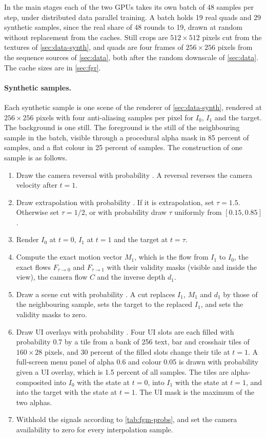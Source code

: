 In the main stages each of the two GPUs takes its own batch of 48 samples per step, under distributed data parallel training. A batch holds 19 real quads and 29 synthetic samples, since the real share  of 48 rounds to 19, drawn at random without replacement from the caches. Still crops are $512\times512$ pixels cut from the textures of \cref{sec:data-synth}, and quads are four frames of $256\times256$ pixels from the sequence sources of \cref{sec:data}, both after the random downscale of \cref{sec:data}. The cache sizes are in \cref{sec:fgr}.

\paragraph{Synthetic samples.} Each synthetic sample is one scene of the renderer of \cref{sec:data-synth}, rendered at $256\times256$ pixels with four anti-aliasing samples per pixel for $I_0$, $I_1$ and the target. The background is one still. The foreground is the still of the neighbouring sample in the batch, visible through a procedural alpha mask in 85 percent of samples, and a flat colour in 25 percent of samples. The construction of one sample is as follows.
\begin{enumerate}
\item Draw the camera reversal with probability . A reversal reverses the camera velocity after $t=1$.
\item Draw extrapolation with probability . If it is extrapolation, set $\tau=1.5$. Otherwise set $\tau=1/2$, or with probability  draw $\tau$ uniformly from $[0.15,0.85]$.
\item Render $I_0$ at $t=0$, $I_1$ at $t=1$ and the target at $t=\tau$.
\item Compute the exact motion vector $M_1$, which is the flow from $I_1$ to $I_0$, the exact flows $F_{\tau\to0}$ and $F_{\tau\to1}$ with their validity masks (visible and inside the view), the camera flow $C$ and the inverse depth $d_1$.
\item Draw a scene cut with probability . A cut replaces $I_1$, $M_1$ and $d_1$ by those of the neighbouring sample, sets the target to the replaced $I_1$, and sets the validity masks to zero.
\item Draw UI overlays with probability . Four UI slots are each filled with probability 0.7 by a tile from a bank of 256 text, bar and crosshair tiles of $160\times28$ pixels, and 30 percent of the filled slots change their tile at $t=1$. A full-screen menu panel of alpha 0.6 and colour 0.05 is drawn with probability  given a UI overlay, which is 1.5 percent of all samples. The tiles are alpha-composited into $I_0$ with the state at $t=0$, into $I_1$ with the state at $t=1$, and into the target with the state at $t=1$. The UI mask is the maximum of the two alphas.
\item Withhold the signals according to \cref{tab:fgm-probs}, and set the camera availability to zero for every interpolation sample.
\end{enumerate}

